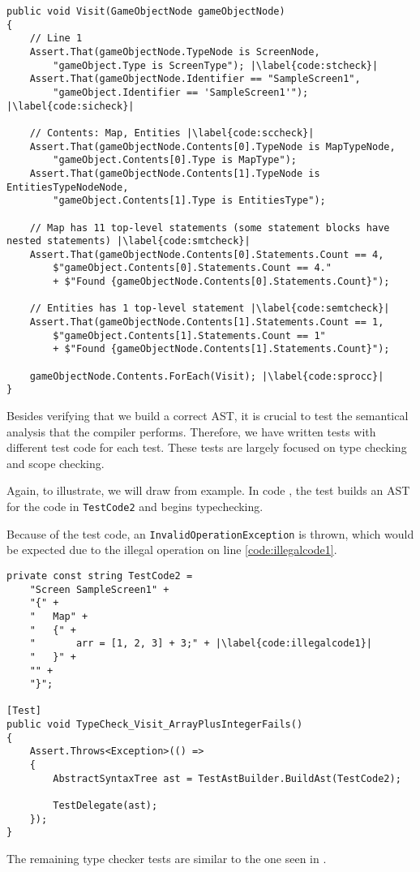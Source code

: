 \begin{lstlisting}[language=CSharp, caption={\texttt{GameObjectNode} visitor code for testing the AST Builder.}, label={lst:gameobjecttest},escapechar=|, language=CSharp]
public void Visit(GameObjectNode gameObjectNode)
{
    // Line 1
    Assert.That(gameObjectNode.TypeNode is ScreenNode,
        "gameObject.Type is ScreenType"); |\label{code:stcheck}|
    Assert.That(gameObjectNode.Identifier == "SampleScreen1", 
        "gameObject.Identifier == 'SampleScreen1'"); |\label{code:sicheck}|
    
    // Contents: Map, Entities |\label{code:sccheck}|
    Assert.That(gameObjectNode.Contents[0].TypeNode is MapTypeNode, 
        "gameObject.Contents[0].Type is MapType");
    Assert.That(gameObjectNode.Contents[1].TypeNode is EntitiesTypeNodeNode, 
        "gameObject.Contents[1].Type is EntitiesType");

    // Map has 11 top-level statements (some statement blocks have nested statements) |\label{code:smtcheck}|
    Assert.That(gameObjectNode.Contents[0].Statements.Count == 4, 
        $"gameObject.Contents[0].Statements.Count == 4." 
        + $"Found {gameObjectNode.Contents[0].Statements.Count}");
    
    // Entities has 1 top-level statement |\label{code:semtcheck}|
    Assert.That(gameObjectNode.Contents[1].Statements.Count == 1, 
        $"gameObject.Contents[1].Statements.Count == 1"
        + $"Found {gameObjectNode.Contents[1].Statements.Count}");
    
    gameObjectNode.Contents.ForEach(Visit); |\label{code:sprocc}|
}
\end{lstlisting}

Besides verifying that we build a correct AST, it is crucial to test the semantical analysis that the \dazel{} compiler performs. Therefore, we have written tests with different \dazel{} test code for each test. These tests are largely focused on type checking and scope checking.

Again, to illustrate, we will draw from example. In code , the test builds an AST for the code in \texttt{TestCode2} and begins typechecking.

Because of the test code, an \texttt{InvalidOperationException} is thrown, which would be expected due to the illegal operation on line \ref{code:illegalcode1}.

\begin{lstlisting}[language=CSharp, caption={Testing that arrays and integers cannot be added together.}, label={lst:ArrayPlusIntegerFails}, language=CSharp, escapechar=|]
private const string TestCode2 =
    "Screen SampleScreen1" +
    "{" +
    "   Map" +
    "   {" +
    "       arr = [1, 2, 3] + 3;" + |\label{code:illegalcode1}|
    "   }" +
    "" +
    "}";

[Test]
public void TypeCheck_Visit_ArrayPlusIntegerFails()
{
    Assert.Throws<Exception>(() =>
    {
        AbstractSyntaxTree ast = TestAstBuilder.BuildAst(TestCode2);

        TestDelegate(ast);
    });
}
\end{lstlisting}

The remaining type checker tests are similar to the one seen in .
